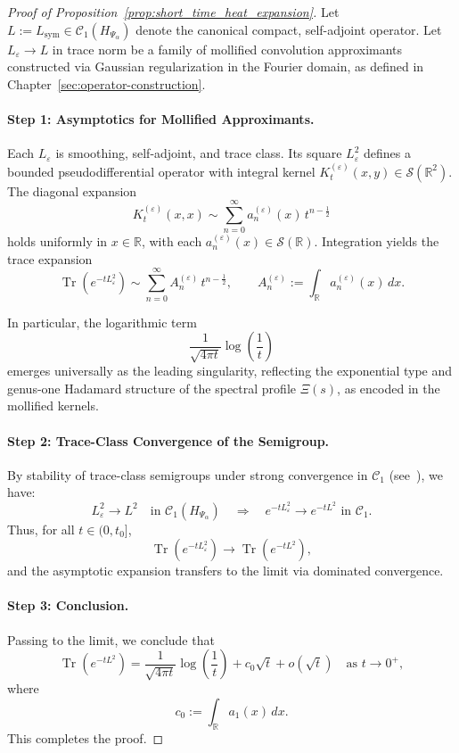 \begin{proof}[Proof of Proposition~\ref{prop:short_time_heat_expansion}]
Let \( L := L_{\mathrm{sym}} \in \mathcal{C}_1(H_{\Psi_\alpha}) \) denote the canonical compact, self-adjoint operator. Let \( L_\varepsilon \to L \) in trace norm be a family of mollified convolution approximants constructed via Gaussian regularization in the Fourier domain, as defined in Chapter~\ref{sec:operator-construction}.

\paragraph{Step 1: Asymptotics for Mollified Approximants.}
Each \( L_\varepsilon \) is smoothing, self-adjoint, and trace class. Its square \( L_\varepsilon^2 \) defines a bounded pseudodifferential operator with integral kernel \( K^{(\varepsilon)}_t(x,y) \in \mathcal{S}(\mathbb{R}^2) \). The diagonal expansion
\[
K^{(\varepsilon)}_t(x,x) \sim \sum_{n=0}^\infty a_n^{(\varepsilon)}(x)\, t^{n - \frac{1}{2}}
\]
holds uniformly in \( x \in \mathbb{R} \), with each \( a_n^{(\varepsilon)}(x) \in \mathcal{S}(\mathbb{R}) \). Integration yields the trace expansion
\[
\operatorname{Tr}(e^{-t L_\varepsilon^2}) \sim \sum_{n=0}^\infty A_n^{(\varepsilon)}\, t^{n - \frac{1}{2}}, \qquad A_n^{(\varepsilon)} := \int_{\mathbb{R}} a_n^{(\varepsilon)}(x)\, dx.
\]

In particular, the logarithmic term
\[
\frac{1}{\sqrt{4\pi t}} \log\left( \frac{1}{t} \right)
\]
emerges universally as the leading singularity, reflecting the exponential type and genus-one Hadamard structure of the spectral profile \( \Xi(s) \), as encoded in the mollified kernels.

\paragraph{Step 2: Trace-Class Convergence of the Semigroup.}
By stability of trace-class semigroups under strong convergence in \( \mathcal{C}_1 \) (see~\cite[Thm.~3.2]{Simon2005TraceIdeals}), we have:
\[
L_\varepsilon^2 \to L^2 \quad \text{in } \mathcal{C}_1(H_{\Psi_\alpha}) \quad \Longrightarrow \quad e^{-t L_\varepsilon^2} \to e^{-t L^2} \text{ in } \mathcal{C}_1.
\]
Thus, for all \( t \in (0, t_0] \),
\[
\operatorname{Tr}(e^{-t L_\varepsilon^2}) \to \operatorname{Tr}(e^{-t L^2}),
\]
and the asymptotic expansion transfers to the limit via dominated convergence.

\paragraph{Step 3: Conclusion.}
Passing to the limit, we conclude that
\[
\operatorname{Tr}(e^{-t L^2}) = \frac{1}{\sqrt{4\pi t}} \log\left( \frac{1}{t} \right) + c_0 \sqrt{t} + o(\sqrt{t}) \quad \text{as } t \to 0^+,
\]
where
\[
c_0 := \int_{\mathbb{R}} a_1(x) \, dx.
\]
This completes the proof.
\end{proof}
